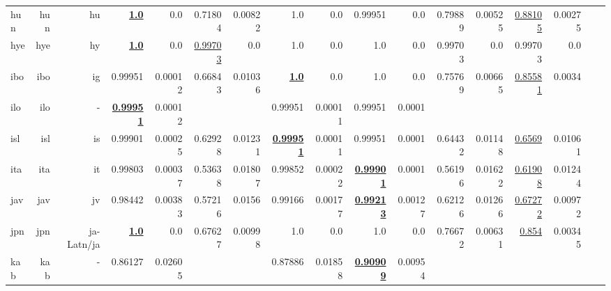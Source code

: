 \documentclass[11pt]{article}
\begin{document}
\begin{table*}[h]
{\begin{tabular}{lrrrrrrrrrrrrrrrr}
hun         & hun         & hu         & \textbf{\underline{1.0}}         & 0.0         & 0.71804         & 0.00822         & 1.0         & 0.0         & 0.99951         & 0.0         & 0.79889         & 0.00525         & \underline{0.88105}         & 0.00275         \\
hye         & hye         & hy         & \textbf{\underline{1.0}}         & 0.0         & \underline{0.99703}         & 0.0         & 1.0         & 0.0         & 1.0         & 0.0         & 0.99703         & 0.0         & 0.99703         & 0.0         \\
ibo         & ibo         & ig         & 0.99951         & 0.00012         & 0.66843         & 0.01036         & \textbf{\underline{1.0}}         & 0.0         & 1.0         & 0.0         & 0.75769         & 0.00665         & \underline{0.85581}         & 0.0034         \\
ilo         & ilo         & -         & \textbf{\underline{0.99951}}         & 0.00012         &          &          & 0.99951         & 0.00011         & 0.99951         & 0.0001         &          &          &          &          \\
isl         & isl         & is         & 0.99901         & 0.00025         & 0.62928         & 0.01231         & \textbf{\underline{0.99951}}         & 0.00011         & 0.99951         & 0.0001         & 0.64432         & 0.01148         & \underline{0.6569}         & 0.01061         \\
ita         & ita         & it         & 0.99803         & 0.00037         & 0.53638         & 0.01807         & 0.99852         & 0.00022         & \textbf{\underline{0.99901}}         & 0.0001         & 0.56196         & 0.01622         & \underline{0.61908}         & 0.01244         \\
jav         & jav         & jv         & 0.98442         & 0.00383         & 0.57216         & 0.0156         & 0.99166         & 0.00177         & \textbf{\underline{0.99213}}         & 0.00127         & 0.62126         & 0.01266         & \underline{0.67272}         & 0.00972         \\
jpn         & jpn         & ja-Latn/ja         & \textbf{\underline{1.0}}         & 0.0         & 0.67627         & 0.00998         & 1.0         & 0.0         & 1.0         & 0.0         & 0.76672         & 0.00631         & \underline{0.854}         & 0.00345         \\
kab         & kab         & -         & 0.86127         & 0.02605         &          &          & 0.87886         & 0.01858         & \textbf{\underline{0.90909}}         & 0.00954         &          &          &          &          \\

\end{tabular}}
\end{table*}
\end{document}
